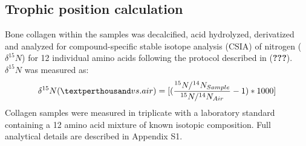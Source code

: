 \documentclass [11pt, proquest] {uwthesis}[2015/03/03]
\begin{document}
\subsection{Trophic position
calculation}\label{trophic-position-calculation}

Bone collagen within the samples was decalcified, acid hydrolyzed,
derivatized and analyzed for compound-specific stable isotope analysis
(CSIA) of nitrogen (\(\delta^{15}N\)) for 12 individual amino acids
following the protocol described in ({\textbf{???}}). \(\delta^{15}N\)
was measured as:
\begin{equation} 
  \delta^{15}N ( \textperthousand vs. air) =   
  [(\frac{^{15}N/^{14}N_{Sample}}{^{15}N/^{14}N_{Air}} -1)*1000]
  \label{eq:deltN2}
\end{equation}
Collagen samples were measured in triplicate with a laboratory standard
containing a 12 amino acid mixture of known isotopic composition. Full
analytical details are described in Appendix S1.
\end{document}
